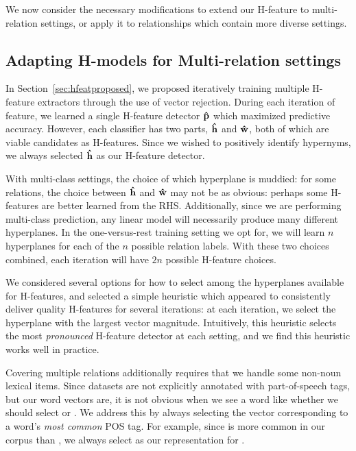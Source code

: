 We now consider the necessary modifications to extend our H-feature to
multi-relation settings, or apply it to relationships which contain more
diverse settings.

\subsection{Adapting H-models for Multi-relation settings}

In Section~\ref{sec:hfeatproposed}, we proposed iteratively training multiple
H-feature extractors through the use of vector rejection. During each iteration
of feature, we learned a single H-feature detector ${\mathbf{\hat p}}$ which maximized
predictive accuracy. However, each classifier has two parts, ${\mathbf{\hat h}}$ and
${\mathbf{\hat w}}$, both of which are viable candidates as H-features. Since we wished to
positively identify hypernyms, we always selected ${\mathbf{\hat h}}$ as our
H-feature detector.

With multi-class settings, the choice of which hyperplane is muddied: for
some relations, the choice between ${\mathbf{\hat h}}$ and ${\mathbf{\hat w}}$ may not be as obvious:
perhaps some H-features are better learned from the RHS. Additionally,
since we are performing multi-class prediction, any linear model will
necessarily produce many different hyperplanes. In the one-versus-rest
training setting we opt for, we will learn $n$ hyperplanes for each of the
$n$ possible relation labels. With these two choices combined, each iteration
will have $2n$ possible H-feature choices.

We considered several options for how to select among the hyperplanes available
for H-features, and selected a simple heuristic which appeared to consistently
deliver quality H-features for several iterations: at each iteration, we select
the hyperplane with the largest vector magnitude. Intuitively, this heuristic
selects the most {\em pronounced} H-feature detector at each setting, and
we find this heuristic works well in practice.

Covering multiple relations additionally requires that we handle some
non-noun lexical items. Since datasets are not explicitly annotated with
part-of-speech tags, but our word vectors are, it is not obvious when we
see a word like  whether we should select  or
. We address this by always selecting the vector corresponding
to a word's {\em most common} POS tag. For example, since  is
more common in our corpus than , we always select 
as our representation for .

